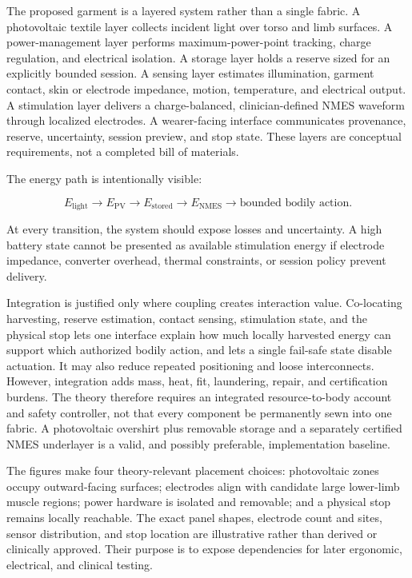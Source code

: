 \documentclass[runningheads]{llncs}
\begin{document}
The proposed garment is a layered system rather than a single fabric. A photovoltaic textile layer collects incident light over torso and limb surfaces. A power-management layer performs maximum-power-point tracking, charge regulation, and electrical isolation. A storage layer holds a reserve sized for an explicitly bounded session. A sensing layer estimates illumination, garment contact, skin or electrode impedance, motion, temperature, and electrical output. A stimulation layer delivers a charge-balanced, clinician-defined NMES waveform through localized electrodes. A wearer-facing interface communicates provenance, reserve, uncertainty, session preview, and stop state. These layers are conceptual requirements, not a completed bill of materials.

The energy path is intentionally visible:

\begin{equation}
E_{\mathrm{light}} \rightarrow E_{\mathrm{PV}} \rightarrow E_{\mathrm{stored}} \rightarrow E_{\mathrm{NMES}} \rightarrow \text{bounded bodily action}.
\end{equation}

At every transition, the system should expose losses and uncertainty. A high battery state cannot be presented as available stimulation energy if electrode impedance, converter overhead, thermal constraints, or session policy prevent delivery.

Integration is justified only where coupling creates interaction value. Co-locating harvesting, reserve estimation, contact sensing, stimulation state, and the physical stop lets one interface explain how much locally harvested energy can support which authorized bodily action, and lets a single fail-safe state disable actuation. It may also reduce repeated positioning and loose interconnects. However, integration adds mass, heat, fit, laundering, repair, and certification burdens. The theory therefore requires an integrated resource-to-body account and safety controller, not that every component be permanently sewn into one fabric. A photovoltaic overshirt plus removable storage and a separately certified NMES underlayer is a valid, and possibly preferable, implementation baseline.

The figures make four theory-relevant placement choices: photovoltaic zones occupy outward-facing surfaces; electrodes align with candidate large lower-limb muscle regions; power hardware is isolated and removable; and a physical stop remains locally reachable. The exact panel shapes, electrode count and sites, sensor distribution, and stop location are illustrative rather than derived or clinically approved. Their purpose is to expose dependencies for later ergonomic, electrical, and clinical testing.
\end{document}

